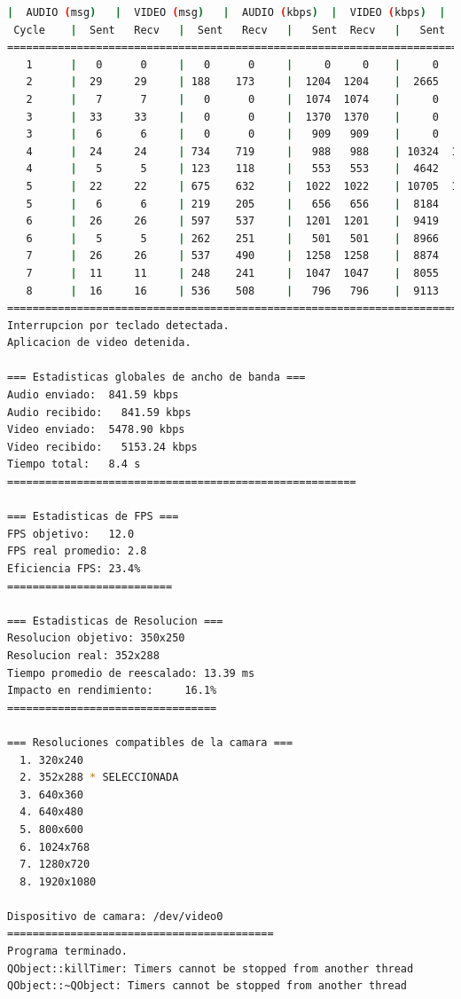 \begin{lstlisting}[language=bash,basicstyle=\ttfamily\scriptsize]
          |  AUDIO (msg)   |  VIDEO (msg)   |  AUDIO (kbps)  |  VIDEO (kbps)  |   CPU (%)
 Cycle    |  Sent   Recv   |  Sent   Recv   |   Sent  Recv   |   Sent  Recv   | Program System
============================================================================================
   1      |   0      0     |   0      0     |     0     0    |     0     0    |   0      0
   2      |  29     29     | 188    173     |  1204  1204    |  2665   2455   |  21     64
   2      |   7      7     |   0      0     |  1074  1074    |     0      0   |  37     65
   3      |  33     33     |   0      0     |  1370  1370    |     0      0   |  39     76
   3      |   6      6     |   0      0     |   909   909    |     0      0   |  27     79
   4      |  24     24     | 734    719     |   988   988    | 10324  10109   |  20     80
   4      |   5      5     | 123    118     |   553   553    |  4642   4453   |  27     77
   5      |  22     22     | 675    632     |  1022  1022    | 10705  10025   |  34     71
   5      |   6      6     | 219    205     |   656   656    |  8184   7661   |  33     71
   6      |  26     26     | 597    537     |  1201  1201    |  9419   8475   |  29     70
   6      |   5      5     | 262    251     |   501   501    |  8966   8590   |  27     69
   7      |  26     26     | 537    490     |  1258  1258    |  8874   8100   |  32     73
   7      |  11     11     | 248    241     |  1047  1047    |  8055   7835   |  26     73
   8      |  16     16     | 536    508     |   796   796    |  9113   8629   |  24     74
============================================================================================
Interrupcion por teclado detectada.
Aplicacion de video detenida.

=== Estadisticas globales de ancho de banda ===
Audio enviado:	841.59 kbps
Audio recibido:   841.59 kbps
Video enviado:	5478.90 kbps
Video recibido:   5153.24 kbps
Tiempo total: 	8.4 s
=======================================================

=== Estadisticas de FPS ===
FPS objetivo: 	12.0
FPS real promedio: 2.8
Eficiencia FPS:	23.4%
==========================

=== Estadisticas de Resolucion ===
Resolucion objetivo: 350x250
Resolucion real: 352x288
Tiempo promedio de reescalado: 13.39 ms
Impacto en rendimiento:    	16.1%
=================================

=== Resoluciones compatibles de la camara ===
  1. 320x240
  2. 352x288 * SELECCIONADA
  3. 640x360
  4. 640x480
  5. 800x600
  6. 1024x768
  7. 1280x720
  8. 1920x1080

Dispositivo de camara: /dev/video0
==========================================
Programa terminado.
QObject::killTimer: Timers cannot be stopped from another thread
QObject::~QObject: Timers cannot be stopped from another thread
\end{lstlisting}
\vspace{\baselineskip}

